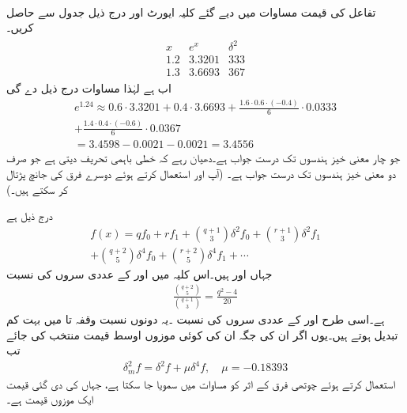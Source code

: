 \quad {}\\
تفاعل  کی قیمت مساوات  میں دیے گئے کلیہ ایورٹ اور درج ذیل جدول سے حاصل کریں۔
\begin{align*}
\begin{array}{c|cc}
x&e^x&\delta^2\\
\hline
1.2&3.3201&333\\
1.3&3.6693&367
\end{array}
\end{align*}
اب  ہے  لہٰذا مساوات  درج ذیل دے گی
\begin{multline*}
e^{1.24}\approx 0.6\cdot 3.3201+0.4\cdot 3.6693+\frac{1.6\cdot 0.6\cdot(-0.4)}{6}\cdot 0.0333\\
+\frac{1.4\cdot 0.4\cdot(-0.6)}{6}\cdot 0.0367\\
=3.4598-0.0021-0.0021=3.4556
\end{multline*}
جو چار معنی خیز ہندسوں تک درست جواب ہے۔دھیان رہے کہ خطی باہمی تحریف  دیتی ہے جو صرف دو معنی خیز ہندسوں تک درست جواب ہے۔ (آپ  اور  استعمال کرتے ہوئے دوسرے فرق کی جانچ پڑتال کر سکتے ہیں۔)

 درج ذیل ہے
\begin{multline}
f(x)=qf_0+rf_1+\binom{q+1}{3}\delta^2 f_0+\binom{r+1}{3}\delta^2 f_1\\
+\binom{q+2}{5}\delta^4 f_0+\binom{r+2}{5}\delta^4 f_1+\cdots
\end{multline}
جہاں  اور  ہیں۔اس کلیہ میں  اور  کے عددی سروں کی نسبت
\begin{align*}
\frac{\binom{q+2}{5}}{\binom{q+1}{3}}=\frac{q^2-4}{20}
\end{align*}
ہے۔اسی طرح  اور  کے عددی سروں کی نسبت ۔یہ دونوں نسبت وقفہ  تا  میں بہت کم تبدیل ہوتے ہیں۔یوں اگر ان کی جگہ ان کی کوئی موزوں اوسط قیمت  منتخب کی جائے  تب 
\begin{align}
\delta_m^2f=\delta^2f+\mu\delta^4f,\quad \mu=-0.18393
\end{align}
 استعمال کرتے ہوئے  چوتھی فرق کے اثر کو مساوات  میں سمویا جا سکتا ہے، جہاں  کی دی گئی قیمت ایک موزوں قیمت ہے۔

